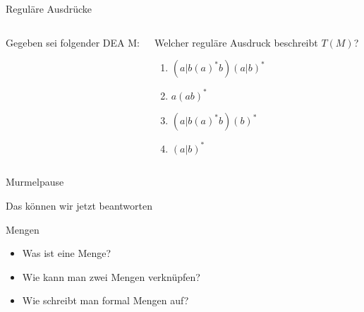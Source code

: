 \documentclass[10pt]{beamer}
\begin{document}
{
\begin{frame}{Reguläre Ausdrücke}
\begin{columns}
\begin{alertblock} {Gegeben sei folgender DEA M:}
\end{alertblock}
    \begin{block}{Welcher reguläre Ausdruck beschreibt $T(M)$?}
        \begin{enumerate}
            \item \alert<2>{$(a|b(a)^*b)(a|b)^*$}
            \item $a(ab)^*$
            \item $(a|b(a)^*b)(b)^*$
            \item $(a|b)^*$
        \end{enumerate}
    \end{block}
\end{columns}
\end{frame}
}

\begin{frame}[standout]
  Murmelpause
\end{frame}

\begin{frame}[fragile]{Das können wir jetzt beantworten}
    \begin{alertblock}{Mengen}
    \begin{itemize}
        \item Was ist eine Menge?
        \item Wie kann man zwei Mengen verknüpfen?
        \item Wie schreibt man formal Mengen auf?
    \end{itemize}
    \end{alertblock}
\end{frame}
\end{document}
